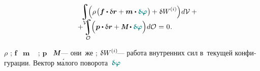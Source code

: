 \begin{otherlanguage}{russian}
\nopagebreak\vspace{-0.3em}\begin{multline}
\hspace*{2em}
\integral\displaylimits_{\mathcal{V}} \hspace{-0.64ex} \left(^{\mathstrut} \hspace{-0.1ex} \rho \hspace{.2ex} \bigl( \bm{f} \dotp \variation{\currentlocationvector} + \bm{m} \dotp \littlerotationvector \hspace{.1ex} \bigr) \hspace{-0.1ex} + \hspace{.1ex} \variation{\internalwork} \hspace{.1ex} \right) \hspace{-0.3ex} d\mathcal{V}
\hspace{.5ex} + \\[-1.2em]
%
+ \integral\displaylimits_{\mathcal{O}} \hspace{-0.64ex} \left(^{\mathstrut} \bm{p} \dotp \variation{\currentlocationvector} + \mathboldM \hspace{-0.1ex} \dotp \littlerotationvector \right) \hspace{-0.3ex} d\mathcal{O} \hspace{.1ex}
= \hspace{.1ex} 0 \hspace{.1ex} .
\hspace*{2em}
\end{multline}

\vspace{-0.2em} \noindent {}
$\rho$\ru{\:---} ;
$\bm{f}$ ~$\bm{m}$\ru{\:---}   ~ ;
$\bm{p}$ ~$\mathboldM$\:--- они~же ;
${\variation{\internalwork}\hspace{-0.2ex}}$\:--- работа внутренних сил  в~текущей конфигурации.
Вектор м\'{а}лого поворота~$\littlerotationvector$


\end{otherlanguage}
